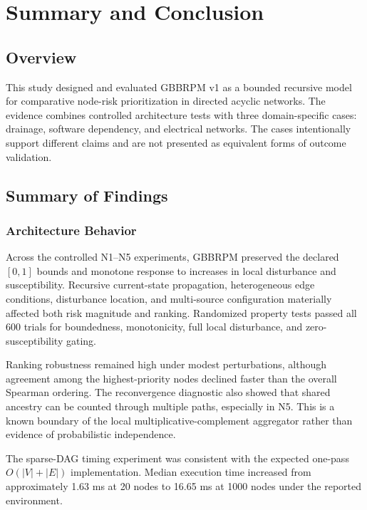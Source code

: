 \section{Summary and Conclusion}\label{summary-and-conclusion}

\subsection{Overview}

This study designed and evaluated GBBRPM v1 as a bounded recursive model
for comparative node-risk prioritization in directed acyclic networks.
The evidence combines controlled architecture tests with three
domain-specific cases: drainage, software dependency, and electrical
networks. The cases intentionally support different claims and are not
presented as equivalent forms of outcome validation.

\subsection{Summary of Findings}

\subsubsection{Architecture Behavior}

Across the controlled N1--N5 experiments, GBBRPM preserved the declared
$[0,1]$ bounds and monotone response to increases in local disturbance
and susceptibility. Recursive current-state propagation, heterogeneous
edge conditions, disturbance location, and multi-source configuration
materially affected both risk magnitude and ranking. Randomized property
tests passed all 600 trials for boundedness, monotonicity, full local
disturbance, and zero-susceptibility gating.

Ranking robustness remained high under modest perturbations, although
agreement among the highest-priority nodes declined faster than the
overall Spearman ordering. The reconvergence diagnostic also showed that
shared ancestry can be counted through multiple paths, especially in N5.
This is a known boundary of the local multiplicative-complement
aggregator rather than evidence of probabilistic independence.

The sparse-DAG timing experiment was consistent with the expected
one-pass $O(|V|+|E|)$ implementation. Median execution time increased
from approximately 1.63 ms at 20 nodes to 16.65 ms at 1000 nodes under
the reported environment.

